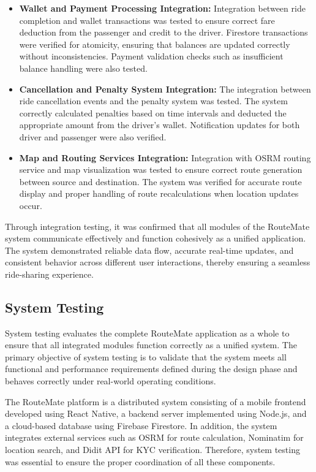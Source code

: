 \documentclass[10pt,a4paper]{report}
\begin{document}
\begin{itemize}
\item \textbf{Wallet and Payment Processing Integration:}
Integration between ride completion and wallet transactions was tested to ensure correct fare deduction from the passenger and credit to the driver. Firestore transactions were verified for atomicity, ensuring that balances are updated correctly without inconsistencies. Payment validation checks such as insufficient balance handling were also tested.

\item \textbf{Cancellation and Penalty System Integration:}
The integration between ride cancellation events and the penalty system was tested. The system correctly calculated penalties based on time intervals and deducted the appropriate amount from the driver’s wallet. Notification updates for both driver and passenger were also verified.

\item \textbf{Map and Routing Services Integration:}
Integration with OSRM routing service and map visualization was tested to ensure correct route generation between source and destination. The system was verified for accurate route display and proper handling of route recalculations when location updates occur.

\end{itemize}

\justify\large Through integration testing, it was confirmed that all modules of the RouteMate system communicate effectively and function cohesively as a unified application. The system demonstrated reliable data flow, accurate real-time updates, and consistent behavior across different user interactions, thereby ensuring a seamless ride-sharing experience.

\subsection{System Testing}

\justify\large System testing evaluates the complete RouteMate application as a whole to ensure that all integrated modules function correctly as a unified system. The primary objective of system testing is to validate that the system meets all functional and performance requirements defined during the design phase and behaves correctly under real-world operating conditions.

\justify\large The RouteMate platform is a distributed system consisting of a mobile frontend developed using React Native, a backend server implemented using Node.js, and a cloud-based database using Firebase Firestore. In addition, the system integrates external services such as OSRM for route calculation, Nominatim for location search, and Didit API for KYC verification. Therefore, system testing was essential to ensure the proper coordination of all these components.
\end{document}
